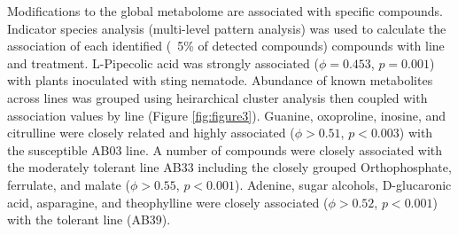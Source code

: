 \documentclass[fleqn,10pt]{wlscirep}
\begin{document}
Modifications to the global metabolome are associated with specific compounds.  Indicator species analysis (multi-level pattern analysis) was used to calculate the association of each identified (~5\% of detected compounds) compounds with line and treatment.  L-Pipecolic acid was strongly associated ($\phi = 0.453$, $p = 0.001$) with plants inoculated with sting nematode.  Abundance of known metabolites across lines was grouped using heirarchical cluster analysis then coupled with association values by line (Figure \ref{fig:figure3}).  Guanine, oxoproline, inosine, and citrulline were closely related and highly associated ($\phi >0.51$, $p < 0.003$) with the susceptible AB03 line.  A number of compounds were closely associated with the moderately tolerant line AB33 including the closely grouped Orthophosphate, ferrulate, and malate ($\phi > 0.55$, $p < 0.001$). Adenine, sugar alcohols, D-glucaronic acid, asparagine, and theophylline were closely associated ($\phi > 0.52$, $p < 0.001$) with the tolerant line (AB39).  
\end{document}

